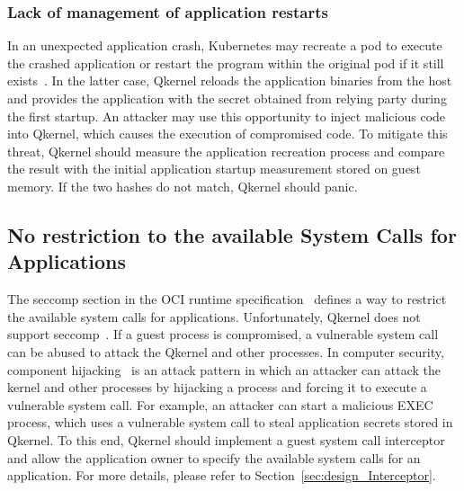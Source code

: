 \subsubsection{Lack of management of application restarts}
In an unexpected application crash, Kubernetes may recreate a pod to execute the crashed application or restart the program within the original pod if it still exists~\cite*{k8s}. In the latter case, Qkernel reloads the application binaries from the host and provides the application with the secret 
obtained from relying party during the first startup. An attacker may use this opportunity to inject malicious code into Qkernel, which causes the execution of compromised code. To mitigate this threat, Qkernel should measure the application recreation process and compare the result with the initial 
application startup measurement stored on guest memory. If the two hashes do not match, Qkernel should panic.

\subsection{No restriction to the available System Calls for Applications}
The seccomp section in the OCI runtime specification~\cite*{oci-spec} defines a way to restrict the available system calls for applications. Unfortunately, Qkernel does not support seccomp~\cite*{seccomp}. If a guest process is compromised, a vulnerable system call can be abused to attack the Qkernel and other processes. 
In computer security, component hijacking~\cite*{DBLP:journals/corr/WuGLD16} is an attack pattern in which an attacker can attack the kernel and other processes by hijacking a process and forcing it to execute a vulnerable system call. For example, an attacker can start a malicious EXEC process, which uses a vulnerable system 
call to steal application secrets stored in Qkernel. To this end, Qkernel should implement a guest system call interceptor and allow the application owner to specify the available system calls for an application. For more details, please refer to Section~\ref*{sec:design_Interceptor}.

